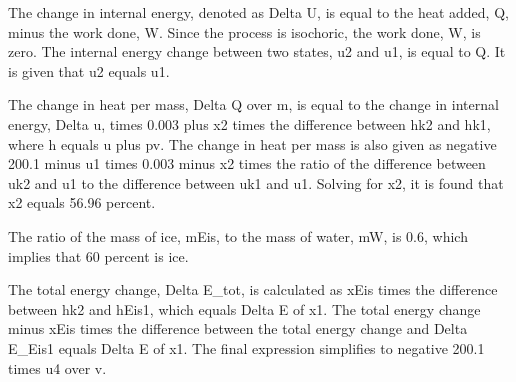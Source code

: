 The change in internal energy, denoted as Delta U, is equal to the heat added, Q, minus the work done, W. Since the process is isochoric, the work done, W, is zero. The internal energy change between two states, u2 and u1, is equal to Q. It is given that u2 equals u1.

The change in heat per mass, Delta Q over m, is equal to the change in internal energy, Delta u, times 0.003 plus x2 times the difference between hk2 and hk1, where h equals u plus pv. The change in heat per mass is also given as negative 200.1 minus u1 times 0.003 minus x2 times the ratio of the difference between uk2 and u1 to the difference between uk1 and u1. Solving for x2, it is found that x2 equals 56.96 percent.

The ratio of the mass of ice, mEis, to the mass of water, mW, is 0.6, which implies that 60 percent is ice.

The total energy change, Delta E_tot, is calculated as xEis times the difference between hk2 and hEis1, which equals Delta E of x1. The total energy change minus xEis times the difference between the total energy change and Delta E_Eis1 equals Delta E of x1. The final expression simplifies to negative 200.1 times u4 over v.